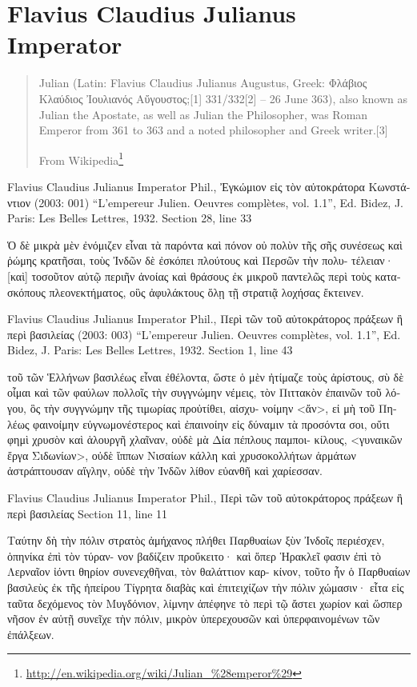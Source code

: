 \documentclass[12pt,letterpaper,twoside,final]{memoir}
\begin{document}
\section{Flavius Claudius Julianus Imperator}
\blockquote[From Wikipedia\footnote{\url{http://en.wikipedia.org/wiki/Julian_\%28emperor\%29}}]{Julian (Latin: Flavius Claudius Julianus Augustus, Greek: Φλάβιος Κλαύδιος Ἰουλιανός Αὔγουστος;[1] 331/332[2]  – 26 June 363), also known as Julian the Apostate, as well as Julian the Philosopher, was Roman Emperor from 361 to 363 and a noted philosopher and Greek writer.[3]}
\begin{greek}

Flavius Claudius Julianus Imperator Phil., Ἐγκώμιον εἰς τὸν αὐτοκράτορα Κωνστάντιον (2003: 001)
“L'empereur Julien. Oeuvres complètes, vol. 1.1”, Ed. Bidez, J.
Paris: Les Belles Lettres, 1932.
Section 28, line 33

       Ὁ δὲ μικρὰ μὲν ἐνόμιζεν εἶναι τὰ παρόντα καὶ 
πόνον οὐ πολὺν τῆς σῆς συνέσεως καὶ ῥώμης κρατῆσαι, 
τοὺς Ἰνδῶν δὲ ἐσκόπει πλούτους καὶ Περσῶν τὴν πολυ-
τέλειαν· [καὶ] τοσοῦτον αὐτῷ περιῆν ἀνοίας καὶ θράσους ἐκ 
μικροῦ παντελῶς περὶ τοὺς κατασκόπους πλεονεκτήματος, 
οὓς ἀφυλάκτους ὅλῃ τῇ στρατιᾷ λοχήσας ἔκτεινεν. 



Flavius Claudius Julianus Imperator Phil., Περὶ τῶν τοῦ αὐτοκράτορος πράξεων ἢ περὶ βασιλείας (2003: 003)
“L'empereur Julien. Oeuvres complètes, vol. 1.1”, Ed. Bidez, J.
Paris: Les Belles Lettres, 1932.
Section 1, line 43

τοῦ τῶν Ἑλλήνων βασιλέως εἶναι ἐθέλοντα, ὥστε ὁ μὲν 
ἠτίμαζε τοὺς ἀρίστους, σὺ δὲ οἶμαι καὶ τῶν φαύλων 
πολλοῖς τὴν συγγνώμην νέμεις, τὸν Πιττακὸν ἐπαινῶν τοῦ 
λόγου, ὃς τὴν συγγνώμην τῆς τιμωρίας προὐτίθει, αἰσχυ-
νοίμην <ἄν>, εἰ μὴ τοῦ Πηλέως φαινοίμην εὐγνωμονέστερος 
καὶ ἐπαινοίην εἰς δύναμιν τὰ προσόντα σοι, οὔτι φημὶ 
χρυσὸν καὶ ἁλουργῆ χλαῖναν, οὐδὲ μὰ Δία πέπλους παμποι-
κίλους, <γυναικῶν ἔργα Σιδωνίων>, οὐδὲ ἵππων Νισαίων 
κάλλη καὶ χρυσοκολλήτων ἁρμάτων ἀστράπτουσαν αἴγλην,   
οὐδὲ τὴν Ἰνδῶν λίθον εὐανθῆ καὶ χαρίεσσαν. 



Flavius Claudius Julianus Imperator Phil., Περὶ τῶν τοῦ αὐτοκράτορος πράξεων ἢ περὶ βασιλείας 
Section 11, line 11

             Ταύτην δὴ τὴν πόλιν στρατὸς ἀμήχανος πλήθει 
Παρθυαίων ξὺν Ἰνδοῖς περιέσχεν, ὁπηνίκα ἐπὶ τὸν τύραν-
νον βαδίζειν προὔκειτο· καὶ ὅπερ Ἡρακλεῖ φασιν ἐπὶ τὸ 
Λερναῖον ἰόντι θηρίον συνενεχθῆναι, τὸν θαλάττιον καρ-
κίνον, τοῦτο ἦν ὁ Παρθυαίων βασιλεὺς ἐκ τῆς ἠπείρου 
Τίγρητα διαβὰς καὶ ἐπιτειχίζων τὴν πόλιν χώμασιν· εἶτα 
εἰς ταῦτα δεχόμενος τὸν Μυγδόνιον, λίμνην ἀπέφηνε τὸ 
περὶ τῷ ἄστει χωρίον καὶ ὥσπερ νῆσον ἐν αὐτῇ συνεῖχε   
τὴν πόλιν, μικρὸν ὑπερεχουσῶν καὶ ὑπερφαινομένων τῶν 
ἐπάλξεων. 




\end{greek}
\end{document}
